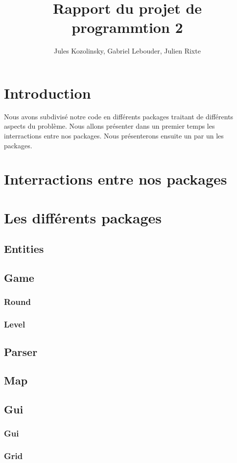 \documentclass{article}
\title{Rapport du projet de programmtion 2}
\author{Jules Kozolinsky, Gabriel Lebouder, Julien Rixte}
\begin{document}
\maketitle

\section{Introduction}
  Nous avons subdivisé notre code en différents packages traitant de différents aspects du problème.
  Nous allons présenter dans un premier temps les interractions entre nos packages.
  Nous présenterons ensuite un par un les packages.

\section{Interractions entre nos packages}


\section{Les différents packages}

\subsection{Entities}

\subsection{Game}
\subsubsection{Round}
\subsubsection{Level}

\subsection{Parser}

\subsection{Map}

\subsection{Gui}
\subsubsection{Gui}
\subsubsection{Grid}
\end{document}
